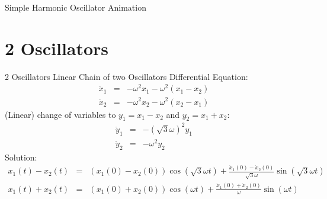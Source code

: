 \documentclass[aspectratio=169]{beamer}
\begin{document}
\begin{frame}{Simple Harmonic Oscillator Animation}
    \centering
\end{frame}



\section{2 Oscillators}

\begin{frame}{2 Oscillators}
    Linear Chain of two Oscillators Differential Equation:
    \begin{eqnarray}
        \ddot x_1 & = &  -\omega^2 x_1 -\omega^2(x_1-x_2) \\
        \ddot x_2 & = &  -\omega^2 x_2 -\omega^2(x_2-x_1) 
    \end{eqnarray}
    \pause
    (Linear) change of variables to $y_1 = x_1 - x_2$ and $y_2 = x_1 + x_2$:
    \begin{eqnarray}
        \ddot y_1 & = &  -(\sqrt{3}\omega)^2 y_1 \\
        \ddot y_2 & = &  -\omega^2 y_2 
    \end{eqnarray}
    \pause
    Solution: 
    \begin{eqnarray}
        x_1(t) - x_2(t) & = & (x_1(0) - x_2(0))\cos(\sqrt{3}\omega t) + \frac{\dot x_1(0) - \dot x_2(0)}{\sqrt{3}\omega}\sin(\sqrt{3}\omega t) \nonumber \\
        x_1(t) + x_2(t) & = & (x_1(0) + x_2(0))\cos(\omega t) + \frac{\dot x_1(0) + \dot x_2(0)}{\omega}\sin(\omega t) \nonumber 
    \end{eqnarray}
\end{frame}
\end{document}
